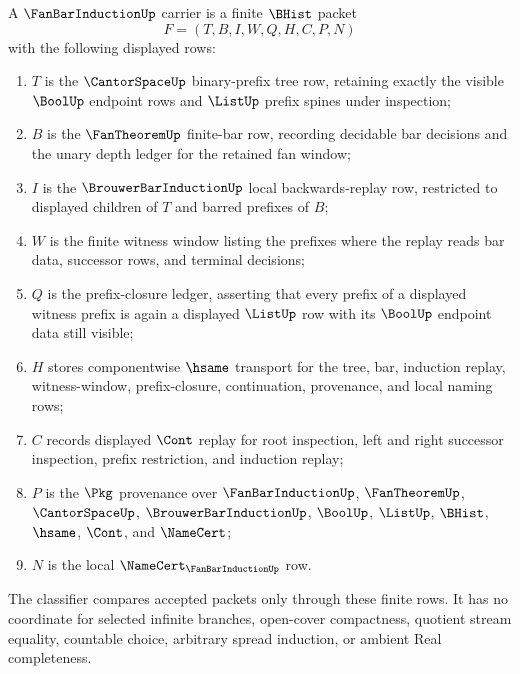 \begin{definition}
\label{def:fan-bar-induction-carrier}
A $\FanBarInductionUp$ carrier is a finite $\BHist$ packet
$$
F=(T,B,I,W,Q,H,C,P,N)
$$
with the following displayed rows:
\begin{enumerate}
\item $T$ is the $\CantorSpaceUp$ binary-prefix tree row, retaining exactly the visible $\BoolUp$ endpoint rows and $\ListUp$ prefix spines under inspection;
\item $B$ is the $\FanTheoremUp$ finite-bar row, recording decidable bar decisions and the unary depth ledger for the retained fan window;
\item $I$ is the $\BrouwerBarInductionUp$ local backwards-replay row, restricted to displayed children of $T$ and barred prefixes of $B$;
\item $W$ is the finite witness window listing the prefixes where the replay reads bar data, successor rows, and terminal decisions;
\item $Q$ is the prefix-closure ledger, asserting that every prefix of a displayed witness prefix is again a displayed $\ListUp$ row with its $\BoolUp$ endpoint data still visible;
\item $H$ stores componentwise $\hsame$ transport for the tree, bar, induction replay, witness-window, prefix-closure, continuation, provenance, and local naming rows;
\item $C$ records displayed $\Cont$ replay for root inspection, left and right successor inspection, prefix restriction, and induction replay;
\item $P$ is the $\Pkg$ provenance over $\FanBarInductionUp$, $\FanTheoremUp$, $\CantorSpaceUp$, $\BrouwerBarInductionUp$, $\BoolUp$, $\ListUp$, $\BHist$, $\hsame$, $\Cont$, and $\NameCert$;
\item $N$ is the local $\NameCert_{\FanBarInductionUp}$ row.
\end{enumerate}
The classifier compares accepted packets only through these finite rows. It has no coordinate for selected infinite branches, open-cover compactness, quotient stream equality, countable choice, arbitrary spread induction, or ambient Real completeness.
\end{definition}

